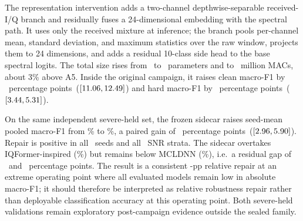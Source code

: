 \documentclass[letterpaper,journal]{IEEEtran}
\newcommand{\pp}{percentage points}
\begin{document}
The representation intervention adds a two-channel depthwise-separable
received-I/Q branch and residually fuses a 24-dimensional embedding with the
spectral path. It uses only the received mixture at inference; the branch
pools per-channel mean, standard deviation, and maximum statistics over the
raw window, projects them to 24 dimensions, and adds a residual 10-class
side head to the base spectral logits. The total size rises from \ParamsAFive\
to \SidecarParameters\ parameters and to \SidecarMacsTotal\ million MACs,
about 3\% above A5. Inside the original campaign, it raises clean macro-F1 by
\SidecarCleanVsAFiveDiff\ \pp\
($[11.06,12.49]$) and hard macro-F1 by
\SidecarHardVsAFiveDiff\ \pp\
($[3.44,5.31]$).

On the same independent severe-held set, the frozen sidecar raises seed-mean
pooled macro-F1 from \SevereRepairLevelAFive\% to
\SevereRepairLevelSidecar\%, a paired gain of \SevereRepairDiff\ \pp\
($[2.96,5.90]$). Repair is positive in all
\SevereRepairPositiveSeeds\ seeds and all \SevereRepairPositiveSnrStrata\ SNR
strata. The sidecar overtakes IQFormer-inspired
(\SevereRepairLevelIqformer\%) but remains below MCLDNN
(\SevereRepairLevelMcldnn\%), i.e.\ a residual gap of
\SevereRepairResidualGapIqformer\ and \SevereRepairResidualGapMcldnn\ \pp. The
result is a consistent \SevereRepairDiff-pp relative repair at an extreme
operating point where all evaluated models remain low in absolute macro-F1; it
should therefore be interpreted as relative robustness repair rather than
deployable classification accuracy at this operating point. Both severe-held
validations remain exploratory post-campaign evidence outside the sealed
family.
\end{document}
